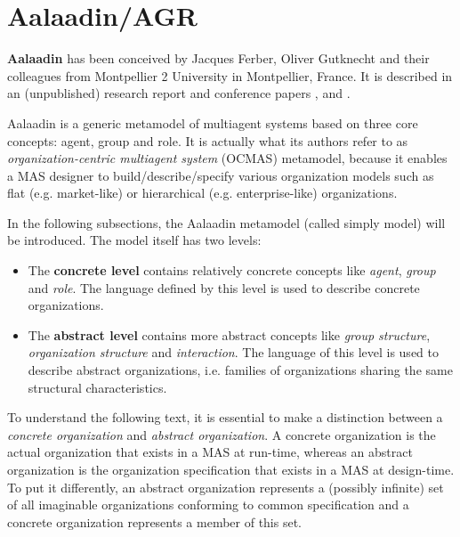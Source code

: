 \section{Aalaadin/AGR}

\textbf{Aalaadin} has been conceived by Jacques Ferber, Oliver Gutknecht and their colleagues from Montpellier 2 University in Montpellier, France.
It is described in an (unpublished) research report \cite{Ferber97} and conference papers \cite{Ferber98}, \cite{Ferber00} and \cite{Ferber03}.

Aalaadin is a generic metamodel of multiagent systems based on three core concepts: agent, group and role.
It is actually what its authors refer to as \textit{organization-centric multiagent system} (OCMAS) metamodel, because it enables a MAS designer to build/describe/specify various organization models such as flat (e.g. market-like) or hierarchical (e.g. enterprise-like) organizations.

In the following subsections, the Aalaadin metamodel (called simply model) will be introduced.
The model itself has two levels:
\begin{itemize}
	\item The \textbf{concrete level} contains relatively concrete concepts like \textit{agent}, \textit{group} and \textit{role}.
	The language defined by this level is used to describe concrete organizations.
	\item The \textbf{abstract level} contains more abstract concepts like \textit{group structure}, \textit{organization structure} and \textit{interaction}. 
	The language of this level is used to describe abstract organizations, i.e. families of organizations sharing the same structural characteristics.
\end{itemize}

To understand the following text, it is essential to make a distinction between a \textit{concrete organization} and \textit{abstract organization}.
A concrete organization is the actual organization that exists in a MAS at run-time, whereas an abstract organization is the organization specification that exists in a MAS at design-time.
To put it differently, an abstract organization represents a (possibly infinite) set of all imaginable organizations conforming to common specification and a concrete organization represents a member of this set.

